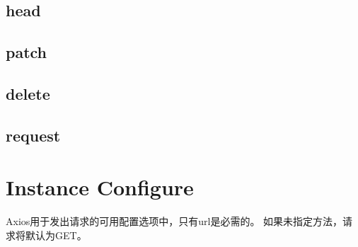 \subsection{head}


\subsection{patch}


\subsection{delete}


\subsection{request}





\section{Instance Configure}

Axios用于发出请求的可用配置选项中，只有url是必需的。 如果未指定方法，请求将默认为GET。

